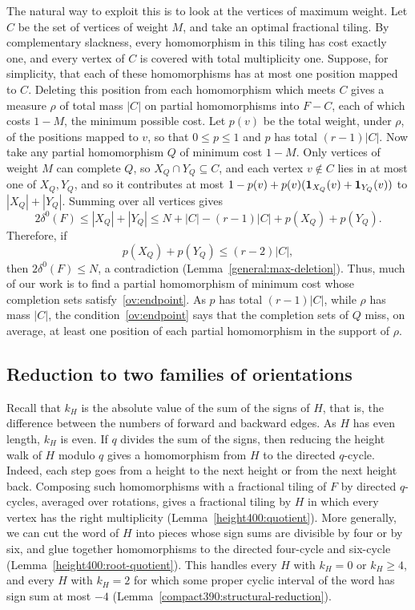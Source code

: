 The natural way to exploit this is to look at the vertices of maximum weight. Let $C$ be the set of vertices of weight $M$, and take an optimal fractional tiling. By complementary slackness, every homomorphism in this tiling has cost exactly one, and every vertex of $C$ is covered with total multiplicity one. Suppose, for simplicity, that each of these homomorphisms has at most one position mapped to $C$. Deleting this position from each homomorphism which meets $C$ gives a measure $\rho$ of total mass $|C|$ on partial homomorphisms into $F-C$, each of which costs $1-M$, the minimum possible cost.
Let $p(v)$ be the total weight, under $\rho$, of the positions mapped to $v$, so that $0\le p\le 1$ and $p$ has total $(r-1)|C|$.
Now take any partial homomorphism $Q$ of minimum cost $1-M$. Only vertices of weight $M$ can complete $Q$, so $X_Q\cap Y_Q\subseteq C$, and each vertex $v\notin C$ lies in at most one of $X_Q,Y_Q$, and so it contributes at most $1-p(v)+p(v)(\mathbf 1_{X_Q}(v)+\mathbf 1_{Y_Q}(v))$ to $|X_Q|+|Y_Q|$. Summing over all vertices gives
\[
 2\delta^0(F)\le|X_Q|+|Y_Q|\le N+|C|-(r-1)|C|+p(X_Q)+p(Y_Q).
\]
Therefore, if
\begin{equation}\label{ov:endpoint}
p(X_Q)+p(Y_Q)\leq (r-2)|C|,
\end{equation}
then $2\delta^0(F)\le N$, a contradiction (Lemma~\ref{general:max-deletion}).
Thus, much of our work is to find a partial homomorphism of minimum cost whose completion sets satisfy~\eqref{ov:endpoint}.
As $p$ has total $(r-1)|C|$, while $\rho$ has mass $|C|$, the condition~\eqref{ov:endpoint} says that the completion sets of $Q$ miss, on average, at least one position of each partial homomorphism in the support of $\rho$.

\subsection{Reduction to two families of orientations}\label{sec:sketch-reduction}
Recall that $k_H$ is the absolute value of the sum of the signs of $H$, that is, the difference between the numbers of forward and backward edges. As $H$ has even length, $k_H$ is even.
If $q$ divides the sum of the signs, then reducing the height walk of $H$ modulo $q$ gives a homomorphism from $H$ to the directed $q$-cycle. Indeed, each step goes from a height to the next height or from the next height back.
Composing such homomorphisms with a fractional tiling of $F$ by directed $q$-cycles, averaged over rotations, gives a fractional tiling by $H$ in which every vertex has the right multiplicity (Lemma~\ref{height400:quotient}).
More generally, we can cut the word of $H$ into pieces whose sign sums are divisible by four or by six, and glue together homomorphisms to the directed four-cycle and six-cycle (Lemma~\ref{height400:root-quotient}).
This handles every $H$ with $k_H=0$ or $k_H\geq 4$, and every $H$ with $k_H=2$ for which some proper cyclic interval of the word has sign sum at most $-4$ (Lemma~\ref{compact390:structural-reduction}).

